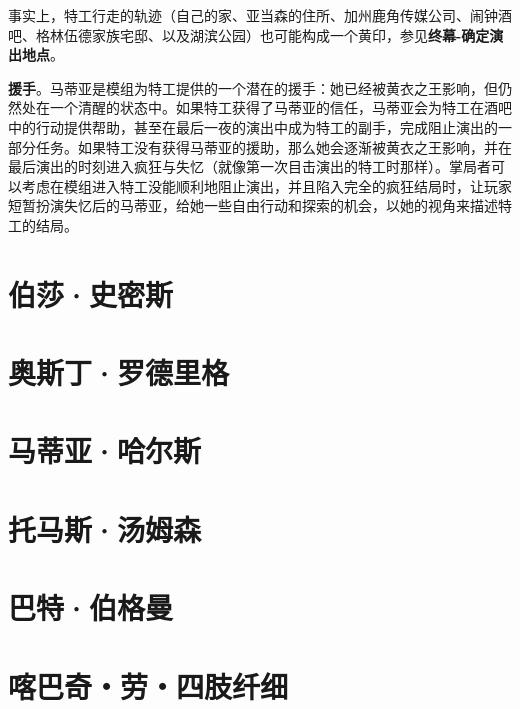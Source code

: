 事实上，特工行走的轨迹（自己的家、亚当森的住所、加州鹿角传媒公司、闹钟酒吧、格林伍德家族宅邸、以及湖滨公园）也可能构成一个黄印，参见\textbf{终幕-确定演出地点}。

\textbf{援手}。马蒂亚是模组为特工提供的一个潜在的援手：她已经被黄衣之王影响，但仍然处在一个清醒的状态中。如果特工获得了马蒂亚的信任，马蒂亚会为特工在酒吧中的行动提供帮助，甚至在最后一夜的演出中成为特工的副手，完成阻止演出的一部分任务。如果特工没有获得马蒂亚的援助，那么她会逐渐被黄衣之王影响，并在最后演出的时刻进入疯狂与失忆（就像第一次目击演出的特工时那样）。掌局者可以考虑在模组进入特工没能顺利地阻止演出，并且陷入完全的疯狂结局时，让玩家短暂扮演失忆后的马蒂亚，给她一些自由行动和探索的机会，以她的视角来描述特工的结局。

\section{伯莎·史密斯}

\section{奥斯丁·罗德里格}

\section{马蒂亚·哈尔斯}

\section{托马斯·汤姆森}

\section{巴特·伯格曼}

\section{喀巴奇・劳・四肢纤细}